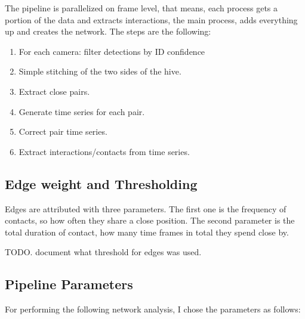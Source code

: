 The pipeline is parallelized on frame level, that means, each process gets a portion of the data and extracts interactions, the main process, adds everything up and creates the network. The steps are the following:

\begin{enumerate}
\item For each camera: filter detections by ID confidence
\item Simple stitching of the two sides of the hive.
\item Extract close pairs.
\item Generate time series for each pair.
\item Correct pair time series.
\item Extract interactions/contacts from time series.
\end{enumerate}


\subsection{Edge weight and Thresholding}
Edges are attributed with three parameters. The first one is the frequency of contacts, so how often they share a close position. The second parameter is the total duration of contact, how many time frames in total they spend close by.
 
TODO. document what threshold for edges was used.

\subsection{Pipeline Parameters}
For performing the following network analysis, I chose the parameters as follows:

